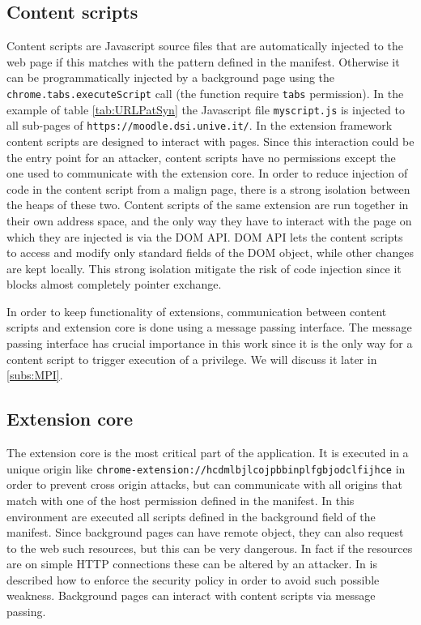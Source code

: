 \subsection{Content scripts}
Content scripts are Javascript source files that are automatically injected to the web page if this matches with the pattern defined in the manifest. Otherwise it can be programmatically injected by a background page using the \texttt{chrome.tabs.executeScript} call (the function require \texttt{tabs} permission). In the example of table \ref{tab:URLPatSyn} the Javascript file \texttt{myscript.js} is injected to all sub-pages of \texttt{https://moodle.dsi.unive.it/}. In the extension framework content scripts are designed to interact with pages. Since this interaction could be the entry point for an attacker, content scripts have no permissions except the one used to communicate with the extension core. In order to reduce injection of code in the content script from a malign page, there is a strong isolation between the heaps of these two. Content scripts of the same extension are run together in their own address space, and the only way they have to interact with the page on which they are injected is via the DOM API. DOM API lets the content scripts to access and modify only standard fields of the DOM object, while other changes are kept locally\cite{ChromeExtSpec}. This strong isolation mitigate the risk of code injection since it blocks almost completely pointer exchange. 

In order to keep functionality of extensions, communication between content scripts and extension core is done using a message passing interface. The message passing interface has crucial importance in this work since it is the only way for a content script to trigger execution of a privilege. We will discuss it later in \ref{subs:MPI}.

\subsection{Extension core}
The extension core is the most critical part of the application. It is executed in a unique origin like \texttt{chrome-extension://hcdmlbjlcojpbbinplfgbjodclfijhce} in order to prevent cross origin attacks, but can communicate with all origins that match with one of the host permission defined in the manifest. In this environment are executed all scripts defined in the background field of the manifest. Since background pages can have remote object, they can also request to the web such resources, but this can be very dangerous. In fact if the resources are on simple HTTP connections these can be altered by an attacker. In \cite{ChromeExtSpecSnd} is described how to enforce the security policy in order to avoid such possible weakness. Background pages can interact with content scripts via message passing.

